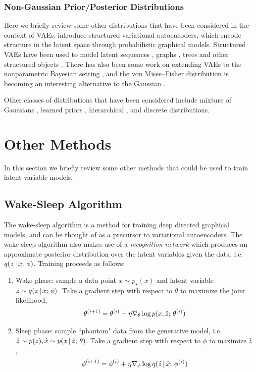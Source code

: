 \documentclass{article}
\begin{document}
\subsubsection{Non-Gaussian Prior/Posterior Distributions}
Here we briefly review some other distributions that have been considered in the context of VAEs.
\cite{Johnson2016} introduce structured variational autoencoders, which
encode structure in the latent space through probabilistic graphical models. 
Structured VAEs have been used to 
model latent sequences \citep{Chung2015,Fraccaro2016,Serban2017,zaheer2017latent,Krishnan2017b,liu2018hsmm}, graphs \citep{kipf2016vae,jin2018junction},  trees \citep{yin2018structvae,corro2018semi} and other structured objects \citep{kusner2017grammar,dai2018syntax}. There has also been some work on
extending VAEs to the nonparametric Bayesian setting \citep{Tran2016GP,Goyal2017,naslinick2017,miao2017nvi,singh2017,bodin2017}, and
the von Mises--Fisher distribution is becoming an interesting alternative
to the Gaussian \citep{Guu2017,Davidson2018,xu2018}.

Other classes of distributions that
have been considered include mixture of Gaussians \citep{Dilokthanakul2016}, learned priors \citep{Tomczak2017,huang2017learn}, hierarchical \citep{Son2016,zhao2017hier,park2018}, and discrete \citep{Rolfe2017,vqvae} distributions.

\section{Other Methods}\label{othermethods}
In this section we briefly review some other methods that could be used to train latent variable models.

\subsection{Wake-Sleep Algorithm}
The wake-sleep algorithm \citep{hinton1995ws} is a method for training deep directed graphical models,
and can be thought of as a precursor to variational autoencoders. The wake-sleep algorithm also makes 
use of a \emph{recognition network} which produces an approximate posterior
distribution over the latent variables given the data, i.e. $q(z \,|\, x ; \, \phi)$. Training proceeds as follows:

\begin{enumerate}
    \item Wake phase: sample a data point $x \sim p_\star(x)$ and latent variable $\hat{z} \sim q(z \,|\, x ; \, \phi)$. Take a gradient step with respect to $\theta$ to maximize the joint likelihood, 
    \[ \theta^{(i+1)} = \theta^{(i)} + \eta \nabla_{\theta} \log p(x, \hat{z} ; \, \theta^{(i)})\]
    \item Sleep phase: sample ``phantom" data from the generative model, i.e. $\hat{z} \sim p(z), \hat{x} \sim p(x \,|\, \hat{z} ; \, \theta)$.  Take a gradient step with respect to $\phi$ to maximize $\hat{z}$, 
    \[ \phi^{(i+1)} = \phi^{(i)} + \eta \nabla_{\phi} \log q(\hat{z} \,|\, \hat{x} ; \, \phi^{(i)})\] 
\end{enumerate}
\end{document}
